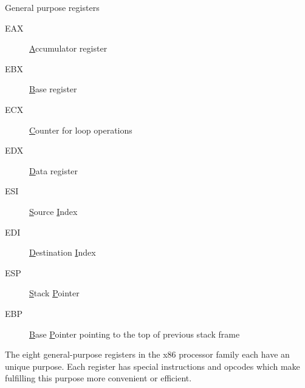 \begin{frame}
  \begin{block}{General purpose registers}
    \begin{multicols}{2}
      \begin{description}
      \item[EAX] \underline{A}ccumulator register
      \item[EBX] \underline{B}ase register
      \item[ECX] \underline{C}ounter for loop operations
      \item[EDX] \underline{D}ata register
        \columnbreak
      \item[ESI] \underline{S}ource \underline{I}ndex
      \item[EDI] \underline{D}estination \underline{I}ndex
      \item[ESP] \underline{S}tack \underline{P}ointer
      \item[EBP] \underline{B}ase \underline{P}ointer pointing to the top of previous stack frame
      \end{description}
    \end{multicols}
  \end{block}
\end{frame}

The eight general-purpose registers in the x86 processor family each have an unique
purpose. Each register has special instructions and opcodes which make fulfilling this
purpose more convenient or efficient. 

